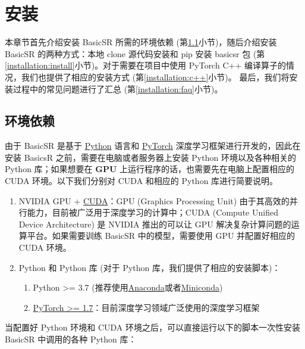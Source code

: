 \documentclass[../main.tex]{subfiles}
\begin{document}
\chapter{安装}
\vspace{-2cm}

本章节首先介绍安装 BasicSR 所需的环境依赖 (第\ref{installation:env-reqirement}小节)，随后介绍安装 BasicSR 的两种方式：本地 clone 源代码安装和 pip 安装 basicsr 包 (第\ref{installation:install}小节)。对于需要在项目中使用 PyTorch C++ 编译算子的情况，我们也提供了相应的安装方式 (第\ref{installation:c++}小节)。
最后，我们将安装过程中的常见问题进行了汇总 (第\ref{installation:faq}小节)。

\section{环境依赖}
\label{installation:env-reqirement}

由于 BasicSR 是基于 \href{https://www.python.org/}{Python} 语言和 \href{https://pytorch.org/}{PyTorch} 深度学习框架进行开发的，因此在安装 BasicsR 之前，需要在电脑或者服务器上安装 Python 环境以及各种相关的 Python 库；如果想要在 \textbf{GPU} 上运行程序的话，也需要先在电脑上配置相应的 CUDA 环境。以下我们分别对 CUDA 和相应的 Python 库进行简要说明。

\begin{enumerate}
    \item NVIDIA GPU + \href{https://developer.nvidia.com/cuda-downloads}{CUDA}：GPU (Graphics Processing Unit) 由于其高效的并行能力，目前被广泛用于深度学习的计算中；CUDA (Compute Unified Device Architecture) 是 NVIDIA 推出的可以让 GPU 解决复杂计算问题的运算平台。如果需要训练 BasicSR 中的模型，需要使用 GPU 并配置好相应的 CUDA 环境。
    \item Python 和 Python 库 (对于 Python 库，我们提供了相应的安装脚本)：
          \begin{enumerate}
              \item Python >= 3.7 (推荐使用\href{https://www.anaconda.com/products/distribution#linux}{Anaconda}或者\href{https://docs.conda.io/en/latest/miniconda.html}{Miniconda})
              \item \href{https://pytorch.org/}{PyTorch >= 1.7}：目前深度学习领域广泛使用的深度学习框架
          \end{enumerate}
\end{enumerate}

当配置好 Python 环境和 CUDA 环境之后，可以直接运行以下的脚本一次性安装 BasicSR 中调用的各种 Python 库：
\end{document}
